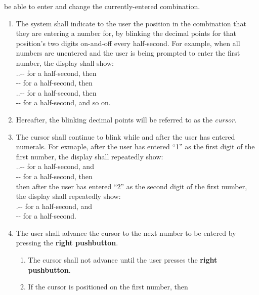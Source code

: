 \begin{enumerate}
    be able to enter and change the currently-entered combination.
    \begin{enumerate}
    \item The system shall indicate to the user the position in the combination
        that they are entering a number for, by blinking the decimal points for
        that position's two digits on-and-off every half-second. For example,
        when all numbers are unentered and the user is being prompted to enter
        the first number, the display shall show: \\
        {\dviiseg \phantom{8}.\phantom{8}.-\phantom{88}-\phantom{88}} for a
            half-second, then \\
        {\dviiseg \phantom{88}-\phantom{88}-\phantom{88}} for a half-second,
            then \\
        {\dviiseg \phantom{8}.\phantom{8}.-\phantom{88}-\phantom{88}} for a
            half-second, then \\
        {\dviiseg \phantom{88}-\phantom{88}-\phantom{88}} for a half-second, and
            so on.
    \item Hereafter, the blinking decimal points will be referred to as the
        \textit{cursor}.
    \item The cursor shall continue to blink while and after the user has
        entered numerals. For exmaple, after the user has entered ``1'' as the
        first digit of the first number, the display shall repeatedly show: \\
        {.\phantom{8}.-\phantom{88}-\phantom{88}} for a
            half-second, and \\
        {\phantom{8}-\phantom{88}-\phantom{88}} for a half-second,
            then \\
        then after the user has entered ``2'' as the second digit of the first
        number, the display shall repeatedly show: \\
        {.-\phantom{88}-\phantom{88}} for a
            half-second, and \\
        {-\phantom{88}-\phantom{88}} for a half-second.
    \item The user shall advance the cursor to the next number to be entered by
        pressing the \textbf{right pushbutton}.
        \begin{enumerate}
        \item The cursor shall not advance until the user presses the
            \textbf{right pushbutton}.
        \item If the cursor is positioned on the first number, then

\end{enumerate}
\end{enumerate}
\end{enumerate}

